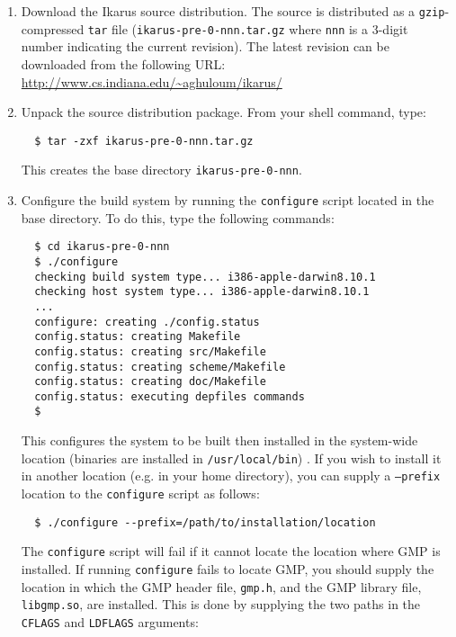 \documentclass[onecolumn, 12pt, twoside, openright, dvipdfm]{book}
\begin{document}
\begin{enumerate}

\item Download the Ikarus source distribution.  The source is
distributed as a \texttt{gzip}-compressed \texttt{tar} file
(\texttt{ikarus-pre-0-nnn.tar.gz} where \texttt{nnn} is a 3-digit
number indicating the current revision).  The latest revision can be
downloaded from the following URL:\\
\url{http://www.cs.indiana.edu/~aghuloum/ikarus/}

\item Unpack the source distribution package.  From your shell
command, type:
\begin{verbatim}
  $ tar -zxf ikarus-pre-0-nnn.tar.gz
\end{verbatim}
This creates the base directory \texttt{ikarus-pre-0-nnn}.

\item Configure the build system by running the \texttt{configure}
script located in the base directory.  To do this, type the
following commands:
\begin{verbatim}
  $ cd ikarus-pre-0-nnn
  $ ./configure
  checking build system type... i386-apple-darwin8.10.1
  checking host system type... i386-apple-darwin8.10.1
  ...
  configure: creating ./config.status
  config.status: creating Makefile
  config.status: creating src/Makefile
  config.status: creating scheme/Makefile
  config.status: creating doc/Makefile
  config.status: executing depfiles commands
  $
\end{verbatim}

This configures the system to be built then installed in the
system-wide location (binaries are installed in
\texttt{/usr/local/bin}) .  If you wish to install it
in another location (e.g. in your home directory), you can supply
a \texttt{--prefix} location to the \texttt{configure} script as
follows:

\begin{verbatim}
  $ ./configure --prefix=/path/to/installation/location
\end{verbatim}

The \texttt{configure} script will fail if it cannot locate the
location where GMP is installed.  If running \texttt{configure}
fails to locate GMP, you should supply the location in which the GMP
header file, \texttt{gmp.h}, and the GMP library file,
\texttt{libgmp.so}, are installed.  This is done by supplying the
two paths in the \texttt{CFLAGS} and \texttt{LDFLAGS} arguments:


\end{enumerate}
\end{document}
